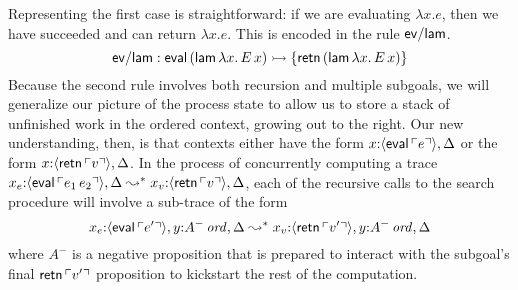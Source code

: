 Representing the first case is straightforward: if we are evaluating
$\lambda x.e$, then we have succeeded and can return $\lambda x.e$. 
This is encoded in the rule ${\sf ev/lam}$. 
\[
{\sf ev/lam} : {\sf eval}\,({\sf lam}\,\lambda x.\,E\,x)
   \rightarrowtail \{ {\sf retn}\,({\sf lam}\,\lambda x.\,E\,x) \}
\]
Because the second rule involves both recursion and multiple subgoals,
we will generalize our picture of the process state to allow us to store a
stack of unfinished work in the ordered context, growing out to the
right. Our new understanding, then, is that contexts either have the
form $x{:}\langle {{\sf eval}\,{\ulcorner{e}\urcorner}} \rangle, \Delta$ or the form $x{:}\langle {{\sf
  retn}\,{\ulcorner{v}\urcorner}} \rangle, \Delta$. In the process of concurrently
computing a trace $x_e{:}\langle {{\sf eval}\,{\ulcorner{e_1\,e_2}\urcorner}} \rangle, \Delta
\leadsto^* x_v{:}\langle {{\sf retn}\,{\ulcorner{v}\urcorner}} \rangle, \Delta$, each of the
recursive calls to the search procedure will involve a sub-trace of the
form
%
\[x_e{:}\langle {{\sf eval}\,{\ulcorner{e'}\urcorner}} \rangle, y{:}{A^-}\,{{\it ord}}, \Delta
  \leadsto^*
  x_v{:}\langle {{\sf retn}\,{\ulcorner{v'}\urcorner}} \rangle, y{:}{A^-}\,{{\it ord}}, \Delta\]
%
  where $A^-$ is a negative proposition that is prepared to interact
  with the subgoal's final ${\sf retn}\,{\ulcorner{v'}\urcorner}$ proposition to
  kickstart the rest of the computation.

